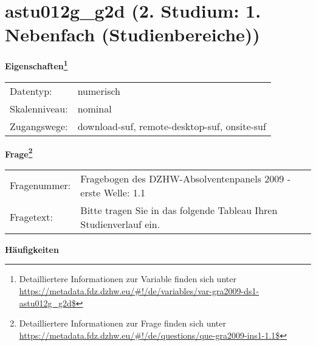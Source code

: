 
    \setcounter{footnote}{0}

    \vspace*{-1.8cm}
	\section{astu012g\_g2d (2. Studium: 1. Nebenfach (Studienbereiche))}
	\label{section:astu012g_g2d}



    \vspace*{0.5cm}
    \noindent\textbf{Eigenschaften\footnote{Detailliertere Informationen zur Variable finden sich unter
		\url{https://metadata.fdz.dzhw.eu/\#!/de/variables/var-gra2009-ds1-astu012g_g2d$}}}\\
	\begin{tabularx}{\hsize}{@{}lX}
	Datentyp: & numerisch \\
	Skalenniveau: & nominal \\
	Zugangswege: &
	  download-suf, 
	  remote-desktop-suf, 
	  onsite-suf
 \\
    \end{tabularx}



				\vspace*{0.5cm}
                \noindent\textbf{Frage\footnote{Detailliertere Informationen zur Frage finden sich unter
		              \url{https://metadata.fdz.dzhw.eu/\#!/de/questions/que-gra2009-ins1-1.1$}}}\\
				\begin{tabularx}{\hsize}{@{}lX}
					Fragenummer: &
					  Fragebogen des DZHW-Absolventenpanels 2009 - erste Welle:
					  1.1
 \\
					Fragetext: & Bitte tragen Sie in das folgende Tableau Ihren Studienverlauf ein. \\
				\end{tabularx}





        		\vspace*{0.5cm}
                \noindent\textbf{Häufigkeiten}

